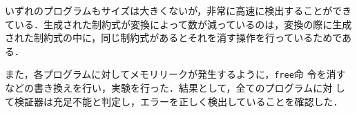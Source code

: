 いずれのプログラムもサイズは大きくないが，非常に高速に検出することができ
ている．生成された制約式が変換によって数が減っているのは，変換の際に生成
された制約式の中に，同じ制約式があるとそれを消す操作を行っているためであ
る．

また，各プログラムに対してメモリリークが発生するように，\texttt{free}命
令を消すなどの書き換えを行い，実験を行った．結果として，全てのプログラムに対
して検証器は充足不能と判定し，エラーを正しく検出していることを確認した．